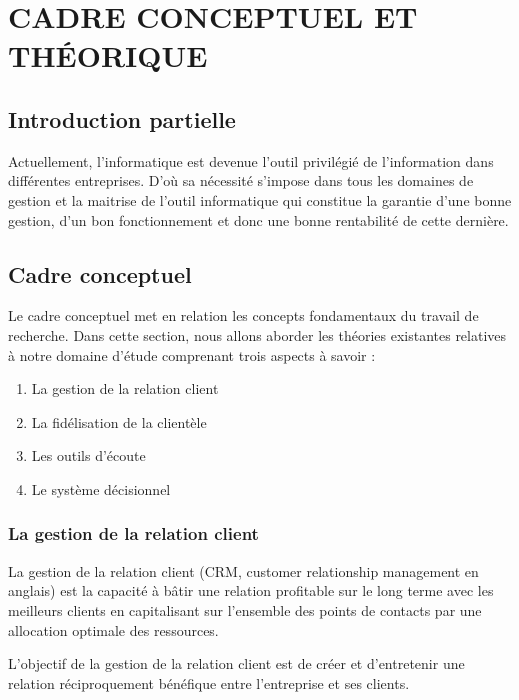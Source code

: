 \chapter[CADRE CONCEPTUEL ET THÉORIQUE]{CADRE CONCEPTUEL ET THÉORIQUE}    
    \section{Introduction partielle}
    Actuellement, l’informatique est devenue l’outil privilégié de l’information dans
    différentes entreprises. D’où sa nécessité s’impose dans tous les domaines de gestion et la
    maitrise de l’outil informatique qui constitue la garantie d’une bonne gestion, d’un bon
    fonctionnement et donc une bonne rentabilité de cette dernière.
    \section[Cadre Conceptuel]{Cadre conceptuel}
    Le cadre conceptuel met en relation les concepts
    fondamentaux du travail de recherche. Dans cette
    section, nous allons aborder les théories existantes
    relatives à notre domaine d’étude comprenant trois
    aspects à savoir :
    \par
        \begin{enumerate}
            \setlength{\itemsep}{0pt}
            \item La gestion de la relation client
            \item La fidélisation de la clientèle
            \item Les outils d’écoute
            \item Le système décisionnel
        \end{enumerate} 
        \subsection[La gestion de la relation client]{La gestion de la relation client}
            La gestion de la relation client (CRM, customer
            relationship management en anglais) est la capacité
            à bâtir une relation profitable sur le long terme
            avec les meilleurs clients en capitalisant sur 
            l’ensemble des points de contacts par une allocation optimale
            des ressources. \cite*{Lefebure2005}
            \par
            L’objectif de la gestion de la relation client
            est de créer et d’entretenir une relation réciproquement
            bénéfique entre l’entreprise et ses clients.
